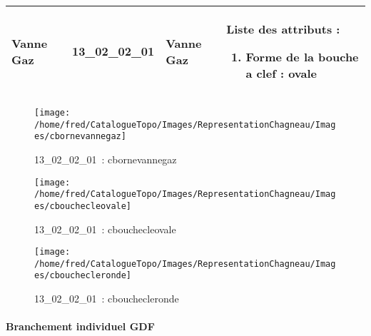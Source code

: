 \documentclass[12pt,titlepage]{book}
\begin{document}
\renewcommand{\arraystretch}{1.2}
\begin{supertabular}{|p{10cm}|c|p{13cm}|p{12cm}|}
 Vanne Gaz & 13\_02\_02\_01 & Vanne Gaz & Liste des attributs :
\begin{enumerate}
  \item Forme de la bouche a clef : ovale\end{enumerate}
\\
\hline
\end{supertabular}
\begin{figure}[h!]
  \hfill         %
  \begin{minipage}[t]{3cm}
    \begin{center}
      \texttt{[image: /home/fred/CatalogueTopo/Images/RepresentationChagneau/Images/cbornevannegaz]}
      \caption[~13\_02\_02\_01]{\small{13\_02\_02\_01~:} \tiny{cbornevannegaz}}\label{cbornevannegaz}
    \end{center}
  \end{minipage}
  \begin{minipage}[t]{3cm}
    \begin{center}
      \texttt{[image: /home/fred/CatalogueTopo/Images/RepresentationChagneau/Images/cbouchecleovale]}
      \caption[~13\_02\_02\_01]{\small{13\_02\_02\_01~:} \tiny{cbouchecleovale}}\label{cbouchecleovale}
    \end{center}
  \end{minipage}
  \begin{minipage}[t]{3cm}
    \begin{center}
      \texttt{[image: /home/fred/CatalogueTopo/Images/RepresentationChagneau/Images/cbouchecleronde]}
      \caption[~13\_02\_02\_01]{\small{13\_02\_02\_01~:} \tiny{cbouchecleronde}}\label{cbouchecleronde}
    \end{center}
  \end{minipage}
\end{figure}


\paragraph{Branchement individuel GDF}
\noindent
\vspace{\baselineskip}
\end{document}
